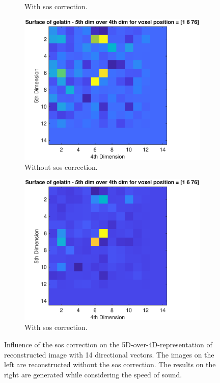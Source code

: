\begin{figure}[H]
\begin{subfigure}[b]{0.47\textwidth}
         \caption{With \ac{sos} correction.}
         \label{leer}
     \end{subfigure}
          \hfill
     \begin{subfigure}[b]{0.47\textwidth}
         \centering
         \includegraphics[width=1.02\textwidth]{Graphics/Results/14_vecs_sos_vs_noSos/5thdim_over4D_no_sos_skin.eps}
         \caption{Without \ac{sos} correction.}
         \label{leer}
     \end{subfigure}
          \hfill
     \begin{subfigure}[b]{0.47\textwidth}
         \centering
         \includegraphics[width=1.02\textwidth]{Graphics/Results/14_vecs_sos_vs_noSos/5thdim_over4D_with_sos_skin.eps}
         \caption{With \ac{sos} correction.}
         \label{leer}
     \end{subfigure}
        \caption{Influence of the \ac{sos} correction on the 5D-over-4D-representation of reconstructed image with 14 directional vectors. The images on the left are reconstructed without the \ac{sos} correction. The results on the right are generated while considering the speed of sound.}
        \label{fig:influence_sos_1}
\end{figure}

